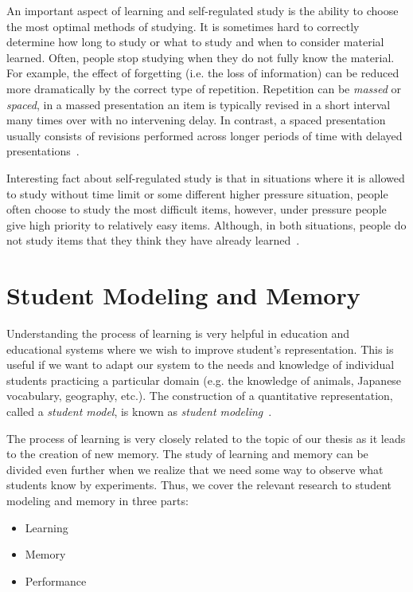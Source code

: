 An important aspect of learning and self-regulated study is the ability to choose the most optimal methods of studying. It is sometimes hard to correctly determine how long to study or what to study and when to consider material learned. Often, people stop studying when they do not fully know the material. For example, the effect of forgetting (i.e. the loss of information) can be reduced more dramatically by the correct type of repetition. Repetition can be \textit{massed} or \textit{spaced}, in a massed presentation an item is typically revised in a short interval many times over with no intervening delay. In contrast, a spaced presentation usually consists of revisions performed across longer periods of time with delayed presentations~\cite{kornell2008learning, pavlik2007optimizing}.

Interesting fact about self-regulated study is that in situations where it is allowed to study without time limit or some different higher pressure situation, people often choose to study the most difficult items, however, under pressure people give high priority to relatively easy items. Although, in both situations, people do not study items that they think they have already learned~\cite{kornell2007promise}.

\section{Student Modeling and Memory}

Understanding the process of learning is very helpful in education and educational systems where we wish to improve student's representation. This is useful if we want to adapt our system to the needs and knowledge of individual students practicing a particular domain (e.g. the knowledge of animals, Japanese vocabulary, geography, etc.). The construction of a quantitative representation, called a \textit{student model}, is known as \textit{student modeling}~\cite{Sison1998}.

The process of learning is very closely related to the topic of our thesis as it leads to the creation of new memory. The study of learning and memory can be divided even further when we realize that we need some way to observe what students know by experiments. Thus, we cover the relevant research to student modeling and memory in three parts:

\begin{itemize}
  \item Learning
  \item Memory
  \item Performance
\end{itemize}

